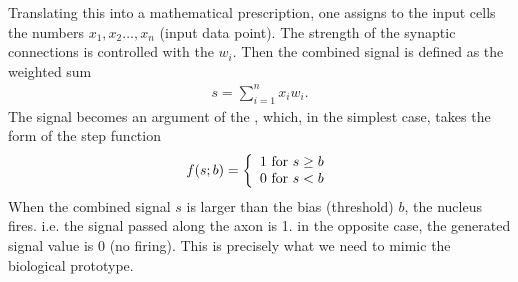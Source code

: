 \documentclass[a4paper,12pt,polish]{jupyterBook}
\begin{document}
\sphinxAtStartPar
Translating this into a mathematical prescription, one assigns to the input cells the numbers \(x_1, x_2 \dots, x_n\) (input data point). The strength of the synaptic connections is controlled with the  \(w_i\). Then the combined signal is defined as the weighted sum
\begin{equation*}
\begin{split}s=\sum_{i=1}^n x_i w_i.\end{split}
\end{equation*}
\sphinxAtStartPar
The signal becomes an argument of the , which, in the simplest case, takes the form of the step function
\begin{equation*}
\begin{split}
f(s;b) = \left \{ \begin{array}{l} 1 {\rm ~for~} s \ge b \\ 0 {\rm ~for~} s < b \end{array} \right .
\end{split}
\end{equation*}
\sphinxAtStartPar
When the combined signal \(s\) is larger than the bias (threshold) \(b\), the nucleus fires. i.e. the signal passed along the axon is 1. in the opposite case, the generated signal value is 0 (no firing). This is precisely what we need to mimic the biological prototype.
\end{document}
